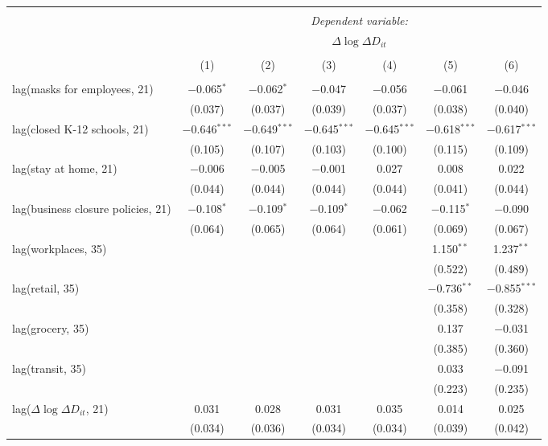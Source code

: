 \begin{tabular}{@{\extracolsep{1pt}}lcccccc} 
\\[-1.8ex]\hline 
\hline \\[-1.8ex] 
 & \multicolumn{6}{c}{\textit{Dependent variable:}} \\ 
\cline{2-7} 
 & \multicolumn{6}{c}{$\Delta \log \Delta D_{it}$} \\ 
\\[-1.8ex] & (1) & (2) & (3) & (4) & (5) & (6)\\ 
\hline \\[-1.8ex] 
 lag(masks for employees, 21) & $-$0.065$^{*}$ & $-$0.062$^{*}$ & $-$0.047 & $-$0.056 & $-$0.061 & $-$0.046 \\ 
  & (0.037) & (0.037) & (0.039) & (0.037) & (0.038) & (0.040) \\ 
  lag(closed K-12 schools, 21) & $-$0.646$^{***}$ & $-$0.649$^{***}$ & $-$0.645$^{***}$ & $-$0.645$^{***}$ & $-$0.618$^{***}$ & $-$0.617$^{***}$ \\ 
  & (0.105) & (0.107) & (0.103) & (0.100) & (0.115) & (0.109) \\ 
  lag(stay at home, 21) & $-$0.006 & $-$0.005 & $-$0.001 & 0.027 & 0.008 & 0.022 \\ 
  & (0.044) & (0.044) & (0.044) & (0.044) & (0.041) & (0.044) \\ 
  lag(business closure policies, 21) & $-$0.108$^{*}$ & $-$0.109$^{*}$ & $-$0.109$^{*}$ & $-$0.062 & $-$0.115$^{*}$ & $-$0.090 \\ 
  & (0.064) & (0.065) & (0.064) & (0.061) & (0.069) & (0.067) \\ 
  lag(workplaces, 35) &  &  &  &  & 1.150$^{**}$ & 1.237$^{**}$ \\ 
  &  &  &  &  & (0.522) & (0.489) \\ 
  lag(retail, 35) &  &  &  &  & $-$0.736$^{**}$ & $-$0.855$^{***}$ \\ 
  &  &  &  &  & (0.358) & (0.328) \\ 
  lag(grocery, 35) &  &  &  &  & 0.137 & $-$0.031 \\ 
  &  &  &  &  & (0.385) & (0.360) \\ 
  lag(transit, 35) &  &  &  &  & 0.033 & $-$0.091 \\ 
  &  &  &  &  & (0.223) & (0.235) \\ 
  lag($\Delta \log \Delta D_{it}$, 21) & 0.031 & 0.028 & 0.031 & 0.035 & 0.014 & 0.025 \\ 
  & (0.034) & (0.036) & (0.034) & (0.034) & (0.039) & (0.042) \\ 

\end{tabular}
